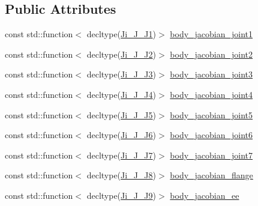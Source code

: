 \subsection*{Public Attributes}
\begin{DoxyCompactItemize}
\item 
const std\+::function$<$ decltype(\hyperlink{libfcimodels_8h_a43ae2c1ca54714ac90313090d1dbba08}{Ji\+\_\+\+J\+\_\+\+J1})$>$ \hyperlink{classfranka_1_1ModelLibrary_ac4ed7bf7cf48cc53df5849f2b61d98c1}{body\+\_\+jacobian\+\_\+joint1}
\item 
const std\+::function$<$ decltype(\hyperlink{libfcimodels_8h_a12fa27e00ef292f30c17393cf42b1ae3}{Ji\+\_\+\+J\+\_\+\+J2})$>$ \hyperlink{classfranka_1_1ModelLibrary_a17c11919cdc971d2acdc2187c6d1b24a}{body\+\_\+jacobian\+\_\+joint2}
\item 
const std\+::function$<$ decltype(\hyperlink{libfcimodels_8h_aba2f9481c1af51e27fb5b933317a9625}{Ji\+\_\+\+J\+\_\+\+J3})$>$ \hyperlink{classfranka_1_1ModelLibrary_ae45bf7b2b154b7a4736d78071d3bc50c}{body\+\_\+jacobian\+\_\+joint3}
\item 
const std\+::function$<$ decltype(\hyperlink{libfcimodels_8h_a6145cbfc0cfbc5f7802736cc1469a9d1}{Ji\+\_\+\+J\+\_\+\+J4})$>$ \hyperlink{classfranka_1_1ModelLibrary_a1b2d1a6882c17a90f28fe09384a4b92d}{body\+\_\+jacobian\+\_\+joint4}
\item 
const std\+::function$<$ decltype(\hyperlink{libfcimodels_8h_a2f89fffd684c249a4ea299f31c35fe8c}{Ji\+\_\+\+J\+\_\+\+J5})$>$ \hyperlink{classfranka_1_1ModelLibrary_a2815fbfeaeb50ec8688bdff85152c7d9}{body\+\_\+jacobian\+\_\+joint5}
\item 
const std\+::function$<$ decltype(\hyperlink{libfcimodels_8h_ae2da204ec27343da7d9ad472376a77aa}{Ji\+\_\+\+J\+\_\+\+J6})$>$ \hyperlink{classfranka_1_1ModelLibrary_a8191423f0e4cf4b9048c121ba88db030}{body\+\_\+jacobian\+\_\+joint6}
\item 
const std\+::function$<$ decltype(\hyperlink{libfcimodels_8h_ac701d80eb32250724b34b0303d5d28ad}{Ji\+\_\+\+J\+\_\+\+J7})$>$ \hyperlink{classfranka_1_1ModelLibrary_aa304c3c44b1e2a8b53782fd93277826c}{body\+\_\+jacobian\+\_\+joint7}
\item 
const std\+::function$<$ decltype(\hyperlink{libfcimodels_8h_a3d37aa0f2e52d0b50ca7b9f807608d69}{Ji\+\_\+\+J\+\_\+\+J8})$>$ \hyperlink{classfranka_1_1ModelLibrary_ac030408b9787df94ebf840cf166552f9}{body\+\_\+jacobian\+\_\+flange}
\item 
const std\+::function$<$ decltype(\hyperlink{libfcimodels_8h_aa5f181fbb9b11570d362d24647a17eeb}{Ji\+\_\+\+J\+\_\+\+J9})$>$ \hyperlink{classfranka_1_1ModelLibrary_a0e3a34c07df598e22fd50d4f764f5786}{body\+\_\+jacobian\+\_\+ee}

\end{DoxyCompactItemize}
